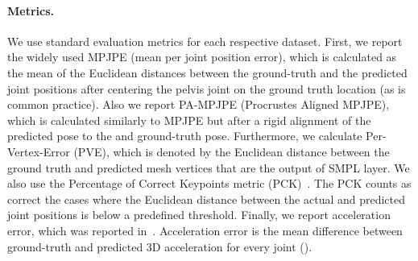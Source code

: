 \documentclass[10pt,twocolumn,letterpaper]{article}
\begin{document}
\paragraph{Metrics.} We use standard evaluation metrics for each respective dataset. First, we report the widely used MPJPE (mean per joint position error), which is calculated as the mean of the Euclidean distances between the ground-truth and the predicted joint positions after centering the pelvis joint on the ground truth location (as is common practice). Also we report PA-MPJPE (Procrustes Aligned MPJPE), which is calculated similarly to MPJPE but after a rigid alignment of the predicted pose to the and ground-truth pose.
Furthermore, we calculate Per-Vertex-Error (PVE), which is denoted by the Euclidean distance between the ground truth and predicted mesh vertices that are the output of SMPL layer. 
We also use the Percentage of Correct Keypoints metric (PCK)~\cite{sapp2013modec}. The PCK counts as correct the cases where the Euclidean distance between the actual and predicted joint positions is below a predefined threshold.
Finally, we report acceleration error, which was reported in~\cite{kanazawa_temporal_hmr}. Acceleration error is the mean difference between ground-truth and predicted 3D acceleration for every joint ().
 
 
\end{document}

